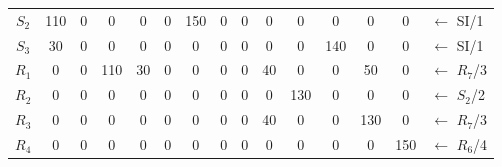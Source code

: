 \documentclass[12pt]{article}
\begin{document}
\begin{enumerate}
\begin{tabular}{|c|c|c|c|c|c|c|c|c|c|c|c|c|c|l}
$S_2$ & 110 & {\color[HTML]{000000} 0}        & {\color[HTML]{000000} 0}        & {\color[HTML]{000000} 0}        & {\color[HTML]{000000} 0}   & {\color[HTML]{FE0000} 150} & {\color[HTML]{000000} 0}   & {\color[HTML]{000000} 0}  & {\color[HTML]{000000} 0}   & {\color[HTML]{000000} 0}   & {\color[HTML]{000000} 0}   & {\color[HTML]{000000} 0}   & {\color[HTML]{000000} 0}   & ${\leftarrow}$ SI/1    \\ \cline{1-14}
$S_3$ & 30  & {\color[HTML]{000000} 0}        & {\color[HTML]{000000} 0}        & {\color[HTML]{000000} 0}        & {\color[HTML]{000000} 0}   & {\color[HTML]{000000} 0}   & {\color[HTML]{000000} 0}   & {\color[HTML]{000000} 0}  & {\color[HTML]{000000} 0}   & {\color[HTML]{000000} 0}   & {\color[HTML]{000000} 140} & {\color[HTML]{000000} 0}   & {\color[HTML]{000000} 0}   & ${\leftarrow}$ SI/1    \\ \cline{1-14}
$R_1$ & 0   & {\color[HTML]{000000} 0}        & {\color[HTML]{000000} 110}      & {\color[HTML]{000000} 30}       & {\color[HTML]{000000} 0}   & {\color[HTML]{000000} 0}   & {\color[HTML]{000000} 0}   & {\color[HTML]{000000} 0}  & {\color[HTML]{000000} 40}  & {\color[HTML]{000000} 0}   & {\color[HTML]{000000} 0}   & {\color[HTML]{000000} 50}  & {\color[HTML]{000000} 0}   &     ${\leftarrow}$ $R_7$/3                   \\ \cline{1-14}
$R_2$ & 0   & {\color[HTML]{000000} 0}        & {\color[HTML]{000000} 0}        & {\color[HTML]{000000} 0}        & {\color[HTML]{000000} 0}   & {\color[HTML]{000000} 0}   & {\color[HTML]{000000} 0}   & {\color[HTML]{000000} 0}  & {\color[HTML]{000000} 0}   & {\color[HTML]{FE0000} 130} & {\color[HTML]{000000} 0}   & {\color[HTML]{000000} 0}   & {\color[HTML]{000000} 0}   & ${\leftarrow}$ $S_2$/2 \\ \cline{1-14}
$R_3$ & 0   & {\color[HTML]{000000} 0}        & {\color[HTML]{000000} 0}        & {\color[HTML]{000000} 0}        & {\color[HTML]{000000} 0}   & {\color[HTML]{000000} 0}   & {\color[HTML]{000000} 0}   & {\color[HTML]{000000} 0}  & {\color[HTML]{000000} 40}  & {\color[HTML]{000000} 0}   & {\color[HTML]{000000} 0}   & {\color[HTML]{000000} 130} & {\color[HTML]{000000} 0}   & ${\leftarrow}$ $R_7$/3 \\ \cline{1-14}
$R_4$ & 0   & {\color[HTML]{000000} 0}        & {\color[HTML]{000000} 0}        & {\color[HTML]{000000} 0}        & {\color[HTML]{000000} 0}   & {\color[HTML]{000000} 0}   & {\color[HTML]{000000} 0}   & {\color[HTML]{000000} 0}  & {\color[HTML]{000000} 0}   & {\color[HTML]{000000} 0}   & {\color[HTML]{000000} 0}   & {\color[HTML]{000000} 0}   & {\color[HTML]{FE0000} 150} & ${\leftarrow}$ $R_6$/4 \\ \cline{1-14}

\end{tabular}
\end{enumerate}
\end{document}
